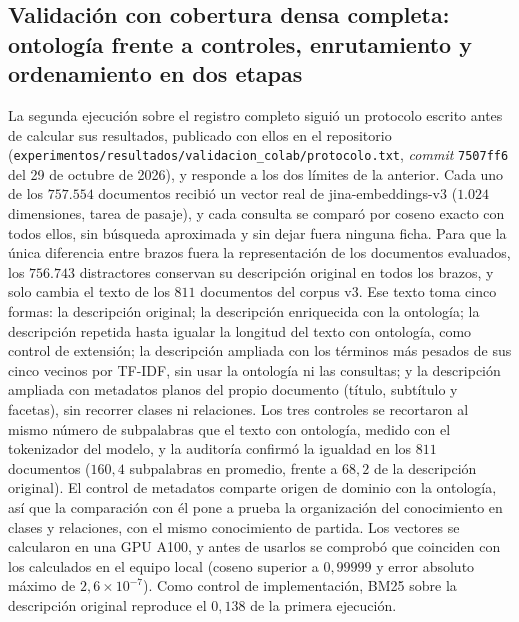 \documentclass[11pt,letterpaper]{article}
\numberwithin{equation}{section}
\begin{document}
\subsection{Validación con cobertura densa completa: ontología frente a controles, enrutamiento y ordenamiento en dos etapas}
\label{sec:res-validacion}
La segunda ejecución sobre el registro completo siguió un protocolo escrito antes de calcular sus resultados, publicado con ellos en el repositorio (\nolinkurl{experimentos/resultados/validacion_colab/protocolo.txt}, \textit{commit} \texttt{7507ff6} del 29 de octubre de 2026), y responde a los dos límites de la anterior. Cada uno de los $757.554$ documentos recibió un vector real de jina-embeddings-v3 ($1.024$ dimensiones, tarea de pasaje), y cada consulta se comparó por coseno exacto con todos ellos, sin búsqueda aproximada y sin dejar fuera ninguna ficha. Para que la única diferencia entre brazos fuera la representación de los documentos evaluados, los $756.743$ distractores conservan su descripción original en todos los brazos, y solo cambia el texto de los $811$ documentos del corpus v3. Ese texto toma cinco formas: la descripción original; la descripción enriquecida con la ontología; la descripción repetida hasta igualar la longitud del texto con ontología, como control de extensión; la descripción ampliada con los términos más pesados de sus cinco vecinos por TF-IDF, sin usar la ontología ni las consultas; y la descripción ampliada con metadatos planos del propio documento (título, subtítulo y facetas), sin recorrer clases ni relaciones. Los tres controles se recortaron al mismo número de subpalabras que el texto con ontología, medido con el tokenizador del modelo, y la auditoría confirmó la igualdad en los $811$ documentos ($160{,}4$ subpalabras en promedio, frente a $68{,}2$ de la descripción original). El control de metadatos comparte origen de dominio con la ontología, así que la comparación con él pone a prueba la organización del conocimiento en clases y relaciones, con el mismo conocimiento de partida. Los vectores se calcularon en una GPU A100, y antes de usarlos se comprobó que coinciden con los calculados en el equipo local (coseno superior a $0{,}99999$ y error absoluto máximo de $2{,}6\times10^{-7}$). Como control de implementación, BM25 sobre la descripción original reproduce el $0{,}138$ de la primera ejecución.
\end{document}
